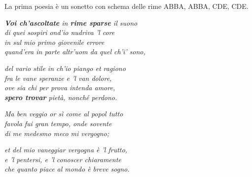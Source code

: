 \documentclass[a4paper]{article}
\begin{document}
La prima poesia è un sonetto con schema delle rime ABBA, ABBA, CDE, CDE.

\begin{center}
    \textit{\textbf{Voi ch'ascoltate} in \textbf{rime sparse} il suono} \\
    \textit{di quei sospiri ond'io nudriva 'l core} \\
    \textit{in sul mio primo giovenile errore} \\
    \textit{quand'era in parte altr'uom da quel ch'i' sono,}
\end{center}
\begin{center}
    \textit{del vario stile in ch'io piango et ragiono} \\
    \textit{fra le vane speranze e 'l van dolore,} \\
    \textit{ove sia chi per prova intenda amore,} \\
    \textit{\textbf{spero trovar} pietà, nonché perdono.}
\end{center}
\begin{center}
    \textit{Ma ben veggio or sì come al popol tutto} \\
    \textit{favola fui gran tempo, onde sovente} \\
    \textit{di me medesmo meco mi vergogno;}
\end{center}
\begin{center}
    \textit{et del mio vaneggiar vergogna è 'l frutto,} \\
    \textit{e 'l pentersi, e 'l conoscer chiaramente} \\
    \textit{che quanto piace al mondo è breve sogno.}
\end{center}
\end{document}
